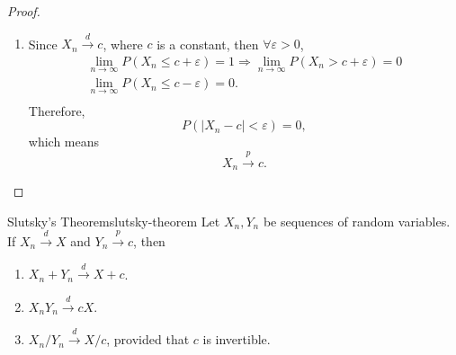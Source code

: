 \begin{proof}
\begin{enumerate}
\begin{equation*}
\begin{gathered}
                  \end{gathered}.
              \end{equation*}
              By the property of distribution (Theorem \ref{thm:distribution-function-property}), as $\varepsilon\rightarrow 0$, then
              \begin{equation*}
                  \lim_{n\rightarrow\infty}F_n(x)=F(x),
              \end{equation*}
              which means,
              \begin{equation*}
                  X_n\stackrel{d}{\rightarrow}X.
              \end{equation*}
        \item
              Since $X_{n}\stackrel{d}{\rightarrow}c$, where $c$ is a constant, then $\forall\varepsilon>0$,
              \begin{equation*}
                  \begin{gathered}
                      \lim_{n\rightarrow\infty}P(X_n\leq c+\varepsilon)=1\Rightarrow\lim_{n\rightarrow\infty}P(X_n>c+\varepsilon)=0\\
                      \lim_{n\rightarrow\infty}P(X_n\leq c-\varepsilon)=0.\\
                  \end{gathered}
              \end{equation*}
              Therefore,
              \begin{equation*}
                  P\left(\left|X_n-c\right|<\varepsilon\right)=0,
              \end{equation*}
              which means
              \begin{equation*}
                  X_n\stackrel{p}{\rightarrow}c.
              \end{equation*}
    \end{enumerate}
\end{proof}

\begin{theorem}{Slutsky's Theorem}{slutsky-theorem}
    Let $X_{n}, Y_{n}$ be sequences of random variables. If $X_{n}\stackrel{d}{\rightarrow}X$ and $Y_{n}\stackrel{p}{\rightarrow}c$, then
    \begin{enumerate}
        \item $X_{n}+Y_{n}\stackrel{d}{\rightarrow}X+c$.
        \item $X_{n}Y_{n}\stackrel{d}{\rightarrow}cX$.
        \item $X_{n}/Y_{n}\stackrel{d}{\rightarrow}X/c$, provided that $c$ is invertible.
    \end{enumerate}
\end{theorem}

